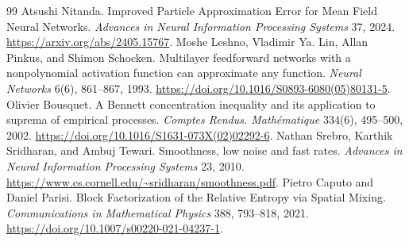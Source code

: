 \documentclass[11pt]{article}
\theoremstyle{remark}\newtheorem{remark}[theorem]{Remark}
\begin{document}
\begin{thebibliography}{99}
 Atsushi Nitanda. Improved Particle Approximation Error for Mean Field Neural Networks. \emph{Advances in Neural Information Processing Systems} 37, 2024. \url{https://arxiv.org/abs/2405.15767}.
 Moshe Leshno, Vladimir Ya. Lin, Allan Pinkus, and Shimon Schocken. Multilayer feedforward networks with a nonpolynomial activation function can approximate any function. \emph{Neural Networks} 6(6), 861--867, 1993. \url{https://doi.org/10.1016/S0893-6080(05)80131-5}.
 Olivier Bousquet. A Bennett concentration inequality and its application to suprema of empirical processes. \emph{Comptes Rendus. Math\'ematique} 334(6), 495--500, 2002. \url{https://doi.org/10.1016/S1631-073X(02)02292-6}.
 Nathan Srebro, Karthik Sridharan, and Ambuj Tewari. Smoothness, low noise and fast rates. \emph{Advances in Neural Information Processing Systems} 23, 2010. \url{https://www.cs.cornell.edu/~sridharan/smoothness.pdf}.
 Pietro Caputo and Daniel Parisi. Block Factorization of the Relative Entropy via Spatial Mixing. \emph{Communications in Mathematical Physics} 388, 793--818, 2021. \url{https://doi.org/10.1007/s00220-021-04237-1}.
\end{thebibliography}
\end{document}

